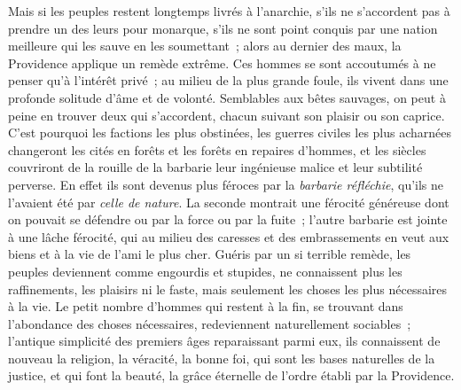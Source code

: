 \documentclass[french,twoside]{book} %
\begin{document}
Mais si les peuples restent longtemps livrés à l’anarchie, s’ils ne s’accordent pas à prendre un des leurs pour monarque, s’ils ne sont point conquis par une nation meilleure qui les sauve en les soumettant ; alors au dernier des maux, la Providence applique un remède extrême. Ces hommes se sont accoutumés à ne penser qu’à l’intérêt privé ; au milieu de la plus grande foule, ils vivent dans une profonde solitude d’âme et de volonté. Semblables aux bêtes sauvages, on peut à peine en trouver deux qui s’accordent, chacun suivant son plaisir ou son caprice. C’est pourquoi les factions les plus obstinées, les guerres civiles les plus acharnées changeront les cités en forêts et les forêts en repaires d’hommes, et les siècles couvriront de  la rouille de la barbarie leur ingénieuse malice et leur subtilité perverse. En effet ils sont devenus plus féroces par la {\itshape barbarie réfléchie}, qu’ils ne l’avaient été par {\itshape celle de nature}. La seconde montrait une férocité généreuse dont on pouvait se défendre ou par la force ou par la fuite ; l’autre barbarie est jointe à une lâche férocité, qui au milieu des caresses et des embrassements en veut aux biens et à la vie de l’ami le plus cher. Guéris par un si terrible remède, les peuples deviennent comme engourdis et stupides, ne connaissent plus les raffinements, les plaisirs ni le faste, mais seulement les choses les plus nécessaires à la vie. Le petit nombre d’hommes qui restent à la fin, se trouvant dans l’abondance des choses nécessaires, redeviennent naturellement sociables ; l’antique simplicité des premiers âges reparaissant parmi eux, ils connaissent de nouveau la religion, la véracité, la bonne foi, qui sont les bases naturelles de la justice, et qui font la beauté, la grâce éternelle de l’ordre établi par la Providence.\par
\end{document}
